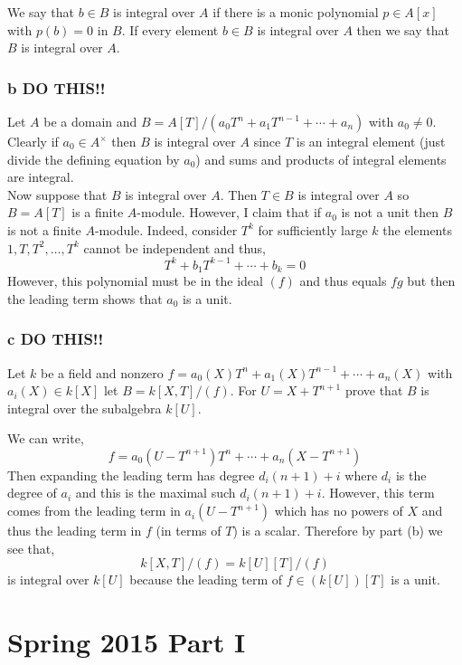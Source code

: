 \documentclass[12pt]{article}
\begin{document}
We say that $b \in B$ is integral over $A$ if there is a monic polynomial $p \in A[x]$ with $p(b) = 0$ in $B$. If every element $b \in B$ is integral over $A$ then we say that $B$ is integral over $A$.

\subsubsection{b DO THIS!!}

Let $A$ be a domain and $B = A[T] / (a_0 T^n + a_1 T^{n-1} + \cdots + a_n)$ with $a_0 \neq 0$. Clearly if $a_0 \in A^\times$ then $B$ is integral over $A$ since $T$ is an integral element (just divide the defining equation by $a_0$) and sums and products of integral elements are integral.
\bigskip\\
Now suppose that $B$ is integral over $A$. Then $T \in B$ is integral over $A$ so $B = A[T]$ is a finite $A$-module. However, I claim that if $a_0$ is not a unit then $B$ is not a finite $A$-module. Indeed, consider $T^k$ for sufficiently large $k$ the elements $1, T, T^2, \dots, T^k$ cannot be independent and thus,
\[ T^k + b_{1} T^{k-1} + \cdots + b_k = 0 \]
However, this polynomial must be in the ideal $(f)$ and thus equals $fg$ but then the leading term shows that $a_0$ is a unit. 


\subsubsection{c DO THIS!!}

\begin{exercise}
Let $k$ be a field and nonzero $f = a_0(X) T^n + a_1(X) T^{n-1} + \cdots  + a_n(X)$ with $a_i(X) \in k[X]$ let $B = k[X,T]/(f)$. For $U = X + T^{n+1}$ prove that $B$ is integral over the subalgebra $k[U]$.
\end{exercise}

We can write,
\[ f = a_0(U - T^{n+1}) T^n + \cdots + a_n(X - T^{n+1}) \]
Then expanding the leading term has degree $d_i (n+1) + i$ where $d_i$ is the degree of $a_i$ and this is the maximal such $d_i (n+1) + i$. However, this term comes from the leading term in $a_i(U - T^{n+1})$ which has no powers of $X$ and thus the leading term in $f$ (in terms of $T$) is a scalar. Therefore by part (b) we see that,
\[ k[X,T]/(f) = k[U][T]/(f) \]
is integral over $k[U]$ because the leading term of $f \in (k[U])[T]$ is a unit.

\section{Spring 2015 Part I}
\end{document}
